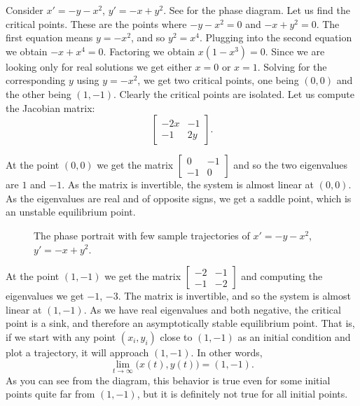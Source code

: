 \begin{example} \label{example:nlin-xplusy}
Consider
$x'=-y-x^2$,
$y'=-x+y^2$.
See  for the phase diagram.
Let us find the critical points.  These are the points where
$-y-x^2 = 0$ and $-x+y^2=0$.  The first equation means $y = -x^2$, and
so $y^2 = x^4$.  Plugging into the second equation we obtain 
$-x+x^4 = 0$.  Factoring we obtain $x(1-x^3)=0$.  Since we are looking only
for real solutions we get either $x=0$ or $x=1$.  Solving for the
corresponding $y$ using $y = -x^2$, we get two critical points, one being $(0,0)$
and the other being $(1,-1)$.  Clearly the critical points are isolated.
Let us compute the Jacobian matrix:
\begin{equation*}
\begin{bmatrix}
-2x & -1 \\
-1 & 2y
\end{bmatrix} .
\end{equation*}

At the point $(0,0)$ we get the matrix
$\left[ \begin{smallmatrix} 0 & -1 \\ -1 & 0 \end{smallmatrix} \right]$ and
so the two eigenvalues are $1$ and $-1$.  As the matrix is invertible, the system is almost linear
at $(0,0)$.  As the eigenvalues are real
and of opposite signs, we get a saddle point, which is an unstable
equilibrium point.

\begin{figure}[h!t]
\capstart
\begin{center}
\caption{The phase portrait with few sample trajectories of 
$x'=-y-x^2$, $y'=-x+y^2$.  \label{fig:nlin-ex813-new}}
\end{center}
\end{figure}
At the point $(1,-1)$ we get the matrix
$\left[ \begin{smallmatrix} -2 & -1 \\ -1 & -2 \end{smallmatrix} \right]$ and
computing the eigenvalues we get $-1$, $-3$.
The matrix is invertible, and so the system is almost linear at $(1,-1)$.
As we have real eigenvalues and both negative, the critical
point is a sink, and therefore an asymptotically stable equilibrium point.
That is, if we start with any point $(x_i,y_i)$ close to $(1,-1)$ as
an initial condition and plot a trajectory, it will approach $(1,-1)$.
In other words,
\begin{equation*}
\lim_{t \to \infty} \bigl( x(t), y(t) \bigr) = (1,-1) .
\end{equation*}
As you can 
see from the diagram, this behavior is true even for some
initial points quite far from $(1,-1)$, but it is definitely not true for all
initial points.
\end{example}

